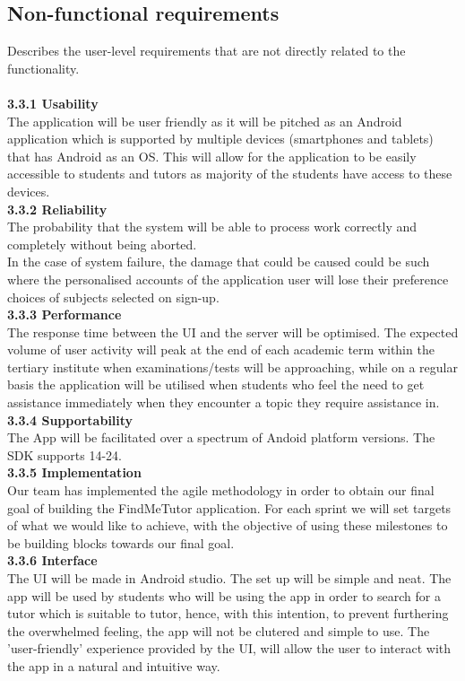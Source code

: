 \documentclass[12pt]{article}
\begin{document}
\subsection{Non-functional requirements}{
Describes the user-level requirements that are not directly related to the functionality. \\
\\\textbf{3.3.1 Usability}\\ 
The application will be user friendly as it will be pitched as an Android application which is supported by multiple devices (smartphones and tablets) that has Android as an OS. This will allow for the application to be easily accessible to students and tutors as majority of the students have access to these devices. 
\\\textbf{3.3.2 Reliability}\\
The probability that the system will be able to process work correctly and completely without being aborted.\\
In the case of system failure, the damage that could be caused could be such where the personalised accounts of the application user will lose their preference choices of subjects selected on sign-up. 
\\\textbf{3.3.3 Performance}\\
The response time between the UI and the server will be optimised.  The expected volume of user activity will peak at the end of each academic term within the tertiary institute when examinations/tests will be approaching, while on a regular basis the application will be utilised when students who feel the need to get assistance immediately when they encounter a topic they require assistance in. 
\\\textbf{3.3.4 Supportability}\\
The App will be facilitated over a spectrum of Andoid platform versions. The SDK supports 14-24. \\
\textbf{3.3.5 Implementation}\\
Our team has implemented the agile methodology in order to obtain our final goal of building the FindMeTutor application. For each sprint we will set targets of what we would like to achieve, with the objective of using these milestones to be building blocks towards our final goal. 
\\\textbf{3.3.6 Interface}\\
The UI will be made in Android studio. The set up will be simple and neat. The app will be used by students who will be using the app in order to search for a tutor which is suitable to tutor, hence, with this intention, to prevent furthering the overwhelmed feeling, the app will not be clutered and simple to use. The 'user-friendly' experience provided by the UI, will allow the user to interact with the app in a natural and intuitive way. \\
}
\end{document}
